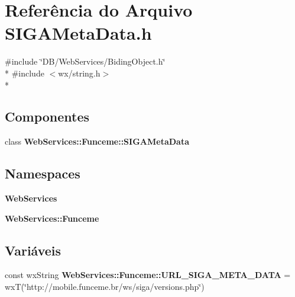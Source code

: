 \section{Referência do Arquivo S\+I\+G\+A\+Meta\+Data.\+h}
\label{_s_i_g_a_meta_data_8h}
{\ttfamily \#include \char`\"{}D\+B/\+Web\+Services/\+Biding\+Object.\+h\char`\"{}}\\*
{\ttfamily \#include $<$wx/string.\+h$>$}\\*
\subsection*{Componentes}
\begin{DoxyCompactItemize}
\item 
class {\bf Web\+Services\+::\+Funceme\+::\+S\+I\+G\+A\+Meta\+Data}
\end{DoxyCompactItemize}
\subsection*{Namespaces}
\begin{DoxyCompactItemize}
\item 
 {\bf Web\+Services}
\item 
 {\bf Web\+Services\+::\+Funceme}
\end{DoxyCompactItemize}
\subsection*{Variáveis}
\begin{DoxyCompactItemize}
\item 
const wx\+String {\bf Web\+Services\+::\+Funceme\+::\+U\+R\+L\+\_\+\+S\+I\+G\+A\+\_\+\+M\+E\+T\+A\+\_\+\+D\+A\+TA} = wxT(\char`\"{}http\+://mobile.\+funceme.\+br/ws/siga/versions.\+php\char`\"{})
\end{DoxyCompactItemize}
